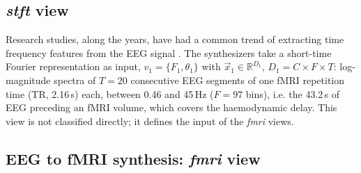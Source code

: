 \documentclass{article}
\begin{document}
\subsection{\textit{stft} view}\label{eeg_views:channel_freq_time}

Research studies, along the years, have had a common trend of extracting time frequency features from the EEG signal \cite{fingelkurts2007impaired,burgess2002functional,albrecht2018time,roach2008event,bates2009low}. The synthesizers take a short-time Fourier representation \cite{jacobsen2003sliding} as input, $v_1=\{F_1, \theta_1\}$ with $\vec{x}_1 \in \mathbb{R}^{D_1}$, $D_1 = C \times F \times T$: log-magnitude spectra of $T=20$ consecutive EEG segments of one fMRI repetition time (TR, 2.16\,s) each, between 0.46 and 45\,Hz ($F=97$ bins), i.e. the 43.2\,s of EEG preceding an fMRI volume, which covers the haemodynamic delay. This view is not classified directly; it defines the input of the \textit{fmri} views.

\subsection{EEG to fMRI synthesis: \textit{fmri} view}\label{eeg_views:eeg_to_fmri}
\end{document}
